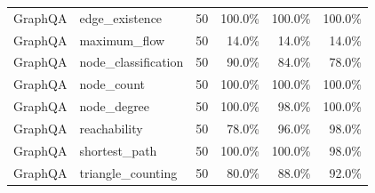 \begin{tabular}{llrrrr}
GraphQA & edge\_existence & 50 & 100.0\% & 100.0\% & 100.0\% \\
GraphQA & maximum\_flow & 50 & 14.0\% & 14.0\% & 14.0\% \\
GraphQA & node\_classification & 50 & 90.0\% & 84.0\% & 78.0\% \\
GraphQA & node\_count & 50 & 100.0\% & 100.0\% & 100.0\% \\
GraphQA & node\_degree & 50 & 100.0\% & 98.0\% & 100.0\% \\
GraphQA & reachability & 50 & 78.0\% & 96.0\% & 98.0\% \\
GraphQA & shortest\_path & 50 & 100.0\% & 100.0\% & 98.0\% \\
GraphQA & triangle\_counting & 50 & 80.0\% & 88.0\% & 92.0\% \\
\bottomrule
\end{tabular}
